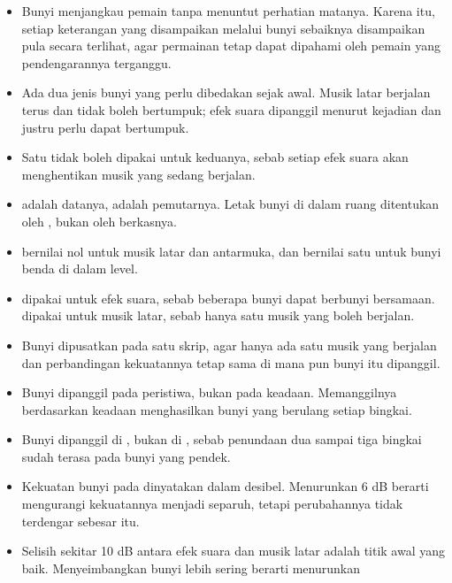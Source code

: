 
\begin{rangkumanbox}
\begin{itemize}
  \item Bunyi menjangkau pemain tanpa menuntut perhatian matanya. Karena itu,
        setiap keterangan yang disampaikan melalui bunyi sebaiknya disampaikan
        pula secara terlihat, agar permainan tetap dapat dipahami oleh pemain
        yang pendengarannya terganggu.
  \item Ada dua jenis bunyi yang perlu dibedakan sejak awal. Musik latar
        berjalan terus dan tidak boleh bertumpuk; efek suara dipanggil menurut
        kejadian dan justru perlu dapat bertumpuk.
  \item Satu  tidak boleh dipakai untuk keduanya, sebab setiap
        efek suara akan menghentikan musik yang sedang berjalan.
  \item {} adalah datanya,  adalah pemutarnya.
        Letak bunyi di dalam ruang ditentukan oleh , bukan
        oleh berkasnya.
  \item {} bernilai nol untuk musik latar dan antarmuka,
        dan bernilai satu untuk bunyi benda di dalam level.
  \item {} dipakai untuk efek suara, sebab beberapa bunyi dapat
        berbunyi bersamaan.  dipakai untuk musik latar, sebab hanya
        satu musik yang boleh berjalan.
  \item Bunyi dipusatkan pada satu skrip, agar hanya ada satu musik yang
        berjalan dan perbandingan kekuatannya tetap sama di mana pun bunyi itu
        dipanggil.
  \item Bunyi dipanggil pada peristiwa, bukan pada keadaan. Memanggilnya
        berdasarkan keadaan menghasilkan bunyi yang berulang setiap bingkai.
  \item Bunyi dipanggil di , bukan di , sebab
        penundaan dua sampai tiga bingkai sudah terasa pada bunyi yang pendek.
  \item Kekuatan bunyi pada  dinyatakan dalam desibel.
        Menurunkan 6 dB berarti mengurangi kekuatannya menjadi separuh, tetapi
        perubahannya tidak terdengar sebesar itu.
  \item Selisih sekitar 10 dB antara efek suara dan musik latar adalah titik
        awal yang baik. Menyeimbangkan bunyi lebih sering berarti menurunkan

\end{itemize}
\end{rangkumanbox}

